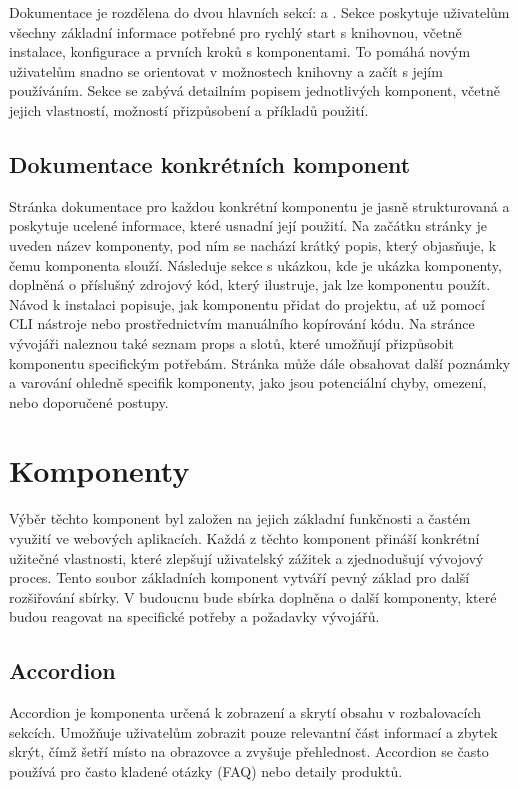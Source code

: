 Dokumentace je rozdělena do dvou hlavních sekcí:  a . Sekce  poskytuje uživatelům všechny základní informace potřebné pro rychlý start s knihovnou, včetně instalace, konfigurace a prvních kroků s komponentami. To pomáhá novým uživatelům snadno se orientovat v možnostech knihovny a začít s jejím používáním. Sekce  se zabývá detailním popisem jednotlivých komponent, včetně jejich vlastností, možností přizpůsobení a příkladů použití.

\subsection{Dokumentace konkrétních komponent}
Stránka dokumentace pro každou konkrétní komponentu je jasně strukturovaná a poskytuje ucelené informace, které usnadní její použití. Na začátku stránky je uveden název komponenty, pod ním se nachází krátký popis, který objasňuje, k čemu komponenta slouží. Následuje sekce s ukázkou, kde je ukázka komponenty, doplněná o příslušný zdrojový kód, který ilustruje, jak lze komponentu použít. Návod k instalaci popisuje, jak komponentu přidat do projektu, ať už pomocí CLI nástroje nebo prostřednictvím manuálního kopírování kódu. Na stránce vývojáři naleznou také seznam props a slotů, které umožňují přizpůsobit komponentu specifickým potřebám. Stránka může dále obsahovat další poznámky a varování ohledně specifik komponenty, jako jsou potenciální chyby, omezení, nebo doporučené postupy.

\section{Komponenty}
Výběr těchto komponent byl založen na jejich základní funkčnosti a častém využití ve webových aplikacích. Každá z těchto komponent přináší konkrétní užitečné vlastnosti, které zlepšují uživatelský zážitek a zjednodušují vývojový proces. Tento soubor základních komponent vytváří pevný základ pro další rozšiřování sbírky. V budoucnu bude sbírka doplněna o další komponenty, které budou reagovat na specifické potřeby a požadavky vývojářů.

\subsection{Accordion}
Accordion je komponenta určená k zobrazení a skrytí obsahu v rozbalovacích sekcích. Umožňuje uživatelům zobrazit pouze relevantní část informací a zbytek skrýt, čímž šetří místo na obrazovce a zvyšuje přehlednost. Accordion se často používá pro často kladené otázky (FAQ) nebo detaily produktů.


